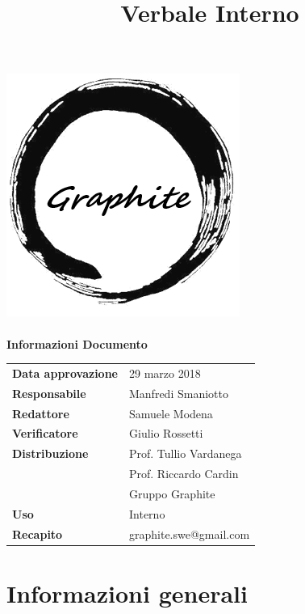 \documentclass[openany,12pt,a4paper]{article}
\title{Verbale Interno}
\author{}
\begin{document}
 
  \makeatletter 
  \begin{titlepage} 
    \setlength{\headsep}{0pt}   
    \begin{center} 
      \includegraphics[width=0.5\linewidth]{Logo.png}\\[1em] 
      {\huge \bfseries  \@title }\\[10ex] 
      \textbf{\Large Informazioni Documento} \\[2em] 
      \bgroup 
      \def\arraystretch{1.5} 
      \begin{tabular}{l|l} 
        \textbf{Data approvazione} & 29 marzo 2018 \\ 
        \textbf{Responsabile} & Manfredi Smaniotto \\ 
        \textbf{Redattore} & Samuele Modena \\ 
        \textbf{Verificatore} & Giulio Rossetti \\ 
        \textbf{Distribuzione} & Prof. Tullio Vardanega \\ 
         & Prof. Riccardo Cardin \\ 
         & Gruppo Graphite \\ 
        \textbf{Uso} & Interno \\ 
        \textbf{Recapito} & graphite.swe@gmail.com \\ 
      \end{tabular} 
    \egroup 
    \end{center} 
  \end{titlepage} 
  \makeatother 
 
  \thispagestyle{empty} 
  \newpage 
   
  \tableofcontents 
  \newpage 
   
  \section{Informazioni generali} 
   
\end{document}
